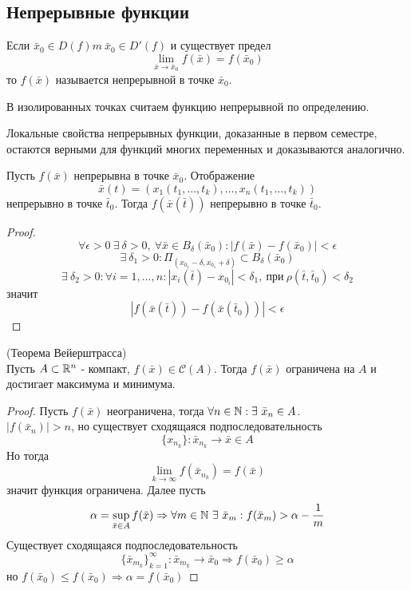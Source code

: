 \subsection{Непрерывные функции}
\begin{definition}
    Если $\bar{x}_0\in D(f)m\ \bar{x}_0\in D'(f)$ и существует предел 
    \[\lim\limits_{\bar{x}\to \bar{x}_0}f(\bar{x})=f(\bar{x}_0)\]
    то $f(\bar{x})$ называется непрерывной в точке $\bar{x}_0$.
\end{definition} 
\begin{comm}
    В изолированных точках считаем функцию непрерывной по определению.
\end{comm} 
\begin{comm}
    Локальные свойства непрерывных функции, доказанные в первом семестре, остаются
    верными для функций многих переменных и доказываются аналогично.
\end{comm} 
\begin{theorem}
    Пусть $f(\bar{x})$ непрерывна в точке $\bar{x}_0$. Отображение
    \[\bar{x}(t)=(x_1(t_1,\dots,t_k), \dots , x_n(t_1, \dots, t_k))\]
    непрерывно в точке $\bar{t}_0$. Тогда $f(\bar{x}(\bar{t}))$ непрерывно в точке $\bar{t}_0$.
\end{theorem} 
\begin{proof}
    \[\forall \epsilon>0\ \exists\ \delta>0,\ \forall \bar{x}\in B_{\delta}(\bar{x}_0): |f(\bar{x})-f(\bar{x}_0)|<\epsilon\]
    \[\exists\ \delta_1>0: \Pi_{(x_{0_1}-\delta, x_{0_1}+\delta)}\subset B_{\delta}(\bar{x}_0)\]
    \[\exists\ \delta_2>0: \forall i=1,\dots, n: |x_i(\bar{t})-x_{0_i}|<\delta_1,\ \text{при}\ \rho(\bar{t}, \bar{t}_0)<\delta_2\]
    значит
    \[|f(\bar{x}(\bar{t}))-f(\bar{x}(\bar{t}_0))|<\epsilon\]
\end{proof}
\begin{theorem} (Теорема Вейерштрасса)\\
    Пусть $A\subset \mathbb{R}^n$ - компакт, $f(\bar{x})\in \mathcal{C}(A)$. Тогда $f(\bar{x})$ ограничена на $A$ и достигает максимума и минимума.
\end{theorem} 
\begin{proof}
    Пусть $f(\bar{x})$ неограничена, тогда $\forall n\in \N: \exists\ \bar{x}_n\in A$.\\
    $|f(\bar{x}_n)|>n$, но существует сходящаяся подпоследовательность
    \[\{x_{n_k}\}: \bar{x}_{n_k}\to \bar{x}\in A\] 
    Но тогда
    \[\lim\limits_{k\to \infty}f(\bar{x}_{n_k})=f(\bar{x})\]
    значит функция ограничена.
    Далее пусть \[\alpha=\sup\limits_{\bar{x}\in A}f(\bar{x}) \Rightarrow \forall m\in \mathbb{N}\ \exists\ \bar{x}_m: f(\bar{x}_m)>\alpha-\frac{1}{m}\] 
    Существует сходящаяся подпоследовательность
    \[\{\bar{x}_{m_k}\}_{k=1}^{\infty}: \bar{x}_{m_k}\to \bar{x}_0 \Rightarrow f(\bar{x}_0)\geq \alpha\] но $f(\bar{x}_0)\leq f(\bar{x}_0) \Rightarrow \alpha= f(\bar{x}_0)$ 
\end{proof} 
